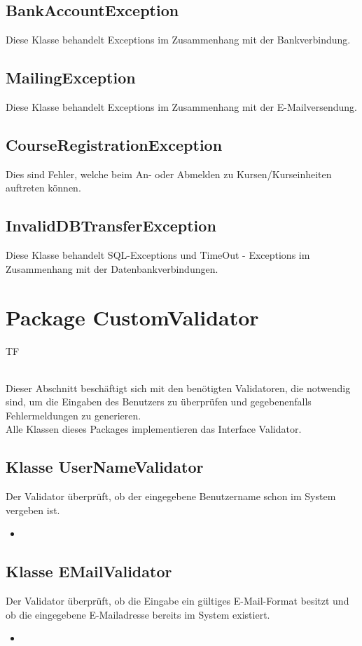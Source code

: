 \documentclass[a4paper]{scrreprt}
\begin{document}
	\subsection{BankAccountException}
	Diese Klasse behandelt Exceptions im Zusammenhang mit der Bankverbindung.
	
	\subsection{MailingException}
	Diese Klasse behandelt Exceptions im Zusammenhang mit der E-Mailversendung.
	
	\subsection{CourseRegistrationException}
	Dies sind Fehler, welche beim An- oder Abmelden zu Kursen/Kurseinheiten auftreten können. 
	
	\subsection{InvalidDBTransferException}
	Diese Klasse behandelt SQL-Exceptions und  TimeOut - Exceptions im Zusammenhang mit der Datenbankverbindungen.
	
	\section{Package CustomValidator}
	\begin{tiny}
		TF\\
	\end{tiny}\\
	Dieser Abschnitt beschäftigt sich mit den benötigten Validatoren, die notwendig sind, um die Eingaben des Benutzers zu überprüfen und gegebenenfalls Fehlermeldungen zu generieren.\\
	Alle Klassen dieses Packages implementieren das Interface Validator.
	
	\subsection{Klasse UserNameValidator}
	Der Validator überprüft, ob der eingegebene Benutzername schon im System vergeben ist.
	\begin{itemize}
		\item \override
	\end{itemize}
	
	\subsection{Klasse EMailValidator}
	Der Validator überprüft, ob die Eingabe ein gültiges E-Mail-Format besitzt und ob die eingegebene E-Mailadresse bereits im System existiert.
	\begin{itemize}
		\item \override
	\end{itemize}
	
\end{document}
